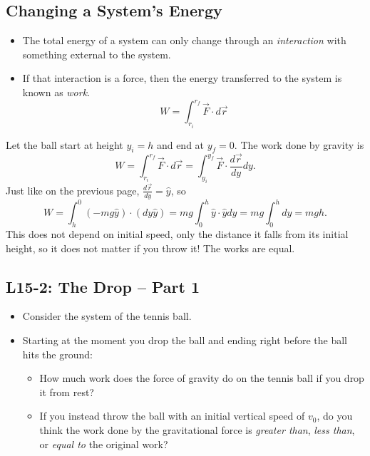 \documentclass[]{article}
\newcommand{\Week}{15}
\begin{document}
\begin{PresentSpace}
\vspace{-10pt}
\section*{Changing a System's Energy}
\vspace{-10pt}
\begin{itemize}
	\item The total energy of a system can only change through an \textit{interaction} with something external to the system.
	\item If that interaction is a force, then the energy transferred to the system is known as \textit{work}.
	\[
	W = \int_{r_{i}}^{r_{f}}\vec{F}\cdot d\vec{r}
	\]
\end{itemize}
\end{PresentSpace}
\newpage
\begin{TeacherMargin}
Let the ball start at height $y_{i} = h$ and end at $y_{f}=0$. The work done by gravity is
\[
W = \int_{r_{i}}^{r_{f}}\vec{F}\cdot d\vec{r} = \int_{y_{i}}^{y_{f}}\vec{F}\cdot \frac{d\vec{r}}{dy} dy.
\]
Just like on the previous page, $\frac{d\vec{r}}{dy} = \hat{y}$, so
\[
W = \int_{h}^{0} (-mg\hat{y})\cdot(dy\hat{y}) = mg\int_{0}^{h}\hat{y}\cdot\hat{y}dy = mg\int_{0}^{h}dy = mgh.
\]
This does not depend on initial speed, only the distance it falls from its initial height, so it does not matter if you throw it! The works are equal.
\end{TeacherMargin}
\begin{PresentSpace}
\vspace{-10pt}
\section*{L\Week-2: The Drop -- Part 1}
\vspace{-10pt}
\begin{itemize}
	\item Consider the system of the tennis ball.
	\item Starting at the moment you drop the ball and ending right before the ball hits the ground:
	\begin{itemize}
		\item How much work does the force of gravity do on the tennis ball if you drop it from rest?
		\item If you instead throw the ball with an initial vertical speed of $v_{0}$, do you think the work done by the gravitational force is \textit{greater than}, \textit{less than}, or \textit{equal to} the original work?
	\end{itemize}
\end{itemize}
\end{PresentSpace}
\end{document}
